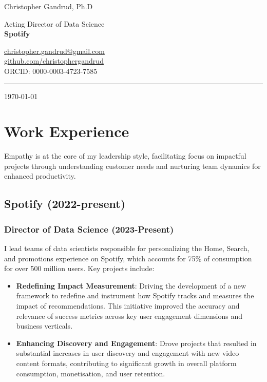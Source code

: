 \documentclass[a4paper]{article}
\begin{document}
\begin{flushright}
    {\huge Christopher Gandrud, Ph.D} \\
    \vspace{0.251cm}

    Acting Director of Data Science \\
    {\bf{\large Spotify}} \\
    \vspace{0.25cm}

    \href{mailto:christopher.gandrud@gmail.com}{christopher.gandrud@gmail.com} \\
    \href{https://github.com/christophergandrud}{github.com/christophergandrud} \\
    ORCID: 0000-0003-4723-7585 \\
    \medskip\hrule height 1pt

    \vspace{0.5cm}
    \today
\end{flushright}

\vspace{0.5cm}

\section*{Work Experience}

\noindent Empathy is at the core of my leadership style, facilitating focus on impactful projects through understanding customer needs and nurturing team dynamics for enhanced productivity.

\subsection*{Spotify (2022-present)}

\subsubsection*{Director of Data Science (2023-Present)}

I lead teams of data scientists responsible for personalizing the Home, Search, and promotions experience on Spotify, which accounts for 75\% of consumption for over 500 million users. Key projects include: \\

\begin{itemize}
    \item \textbf{Redefining Impact Measurement}: Driving the development of a new framework to redefine and instrument how Spotify tracks and measures the impact of recommendations. This initiative improved the accuracy and relevance of success metrics across key user engagement dimensions and business verticals.
    \item \textbf{Enhancing Discovery and Engagement}: Drove projects that resulted in substantial increases in user discovery and engagement with new video content formats, contributing to significant growth in overall platform consumption, monetisation, and user retention.
\end{itemize}
\end{document}
